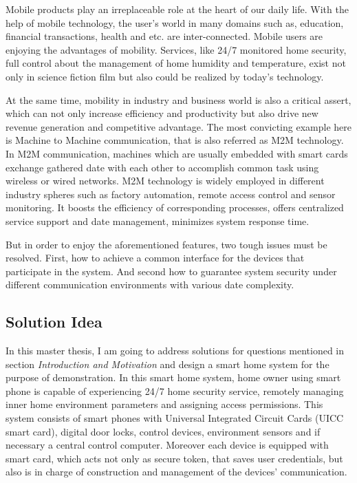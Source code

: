 \documentclass[]{llncs}
\begin{document}
Mobile products  play an irreplaceable role at the heart of our  daily life. With the help of mobile technology, the user's world in many domains such as, education, financial transactions, health and etc. are inter-connected. Mobile users are enjoying the advantages of mobility. Services, like 24/7 monitored home security, full control about the management of home humidity and temperature, exist not only in science fiction film but also could be realized by today's technology.

At the same time, mobility in industry and business world is also a critical  assert, which can not only increase efficiency and productivity but also drive new revenue generation and competitive advantage. The most convicting example here is Machine to Machine communication, that is also referred as M2M technology. In M2M communication, machines which are usually embedded with smart cards exchange gathered date with each other to accomplish common task using wireless or wired networks. M2M technology is widely employed in different industry spheres such as factory automation, remote access control and sensor monitoring. It boosts the efficiency of corresponding processes, offers centralized service support and date management, minimizes system response time.

But in order to enjoy the aforementioned features, two tough issues must be resolved. First, how to achieve a common interface for the devices that participate in the system.  And second how to guarantee system security under different communication environments with various date complexity.

\subsection{Solution Idea}
In this master thesis, I am going to address solutions for questions mentioned in  section \emph{Introduction and Motivation} and  design a smart home system for the purpose of demonstration. In this smart home system, home owner using smart phone is capable of experiencing 24/7 home security service, remotely managing inner home environment parameters and assigning access permissions. This system consists of smart phones with Universal Integrated Circuit Cards (UICC  smart card), digital door locks, control devices, environment sensors and if necessary a central control computer. Moreover each device is equipped with smart card, which acts  not only as secure token, that saves  user credentials, but also is in charge of  construction and management of the devices' communication.
\end{document}
